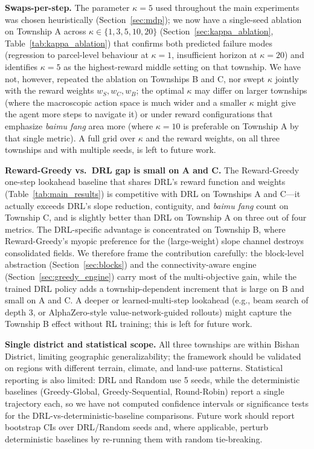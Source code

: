 \documentclass[preprint,12pt]{elsarticle}
\begin{document}
\textbf{Swaps-per-step.} The parameter $\kappa = 5$ used throughout the main experiments was chosen heuristically (Section~\ref{sec:mdp}); we now have a single-seed ablation on Township A across $\kappa \in \{1,3,5,10,20\}$ (Section~\ref{sec:kappa_ablation}, Table~\ref{tab:kappa_ablation}) that confirms both predicted failure modes (regression to parcel-level behaviour at $\kappa{=}1$, insufficient horizon at $\kappa{=}20$) and identifies $\kappa = 5$ as the highest-reward middle setting on that township. We have not, however, repeated the ablation on Townships B and C, nor swept $\kappa$ jointly with the reward weights $w_S, w_C, w_B$; the optimal $\kappa$ may differ on larger townships (where the macroscopic action space is much wider and a smaller $\kappa$ might give the agent more steps to navigate it) or under reward configurations that emphasize \textit{baimu fang} area more (where $\kappa = 10$ is preferable on Township A by that single metric). A full grid over $\kappa$ and the reward weights, on all three townships and with multiple seeds, is left to future work.

\textbf{Reward-Greedy vs.\ DRL gap is small on A and C.} The Reward-Greedy one-step lookahead baseline that shares DRL's reward function and weights (Table~\ref{tab:main_results}) is competitive with DRL on Townships A and C---it actually exceeds DRL's slope reduction, contiguity, and \textit{baimu fang} count on Township C, and is slightly better than DRL on Township A on three out of four metrics. The DRL-specific advantage is concentrated on Township B, where Reward-Greedy's myopic preference for the (large-weight) slope channel destroys consolidated fields. We therefore frame the contribution carefully: the block-level abstraction (Section~\ref{sec:blocks}) and the connectivity-aware engine (Section~\ref{sec:greedy_engine}) carry most of the multi-objective gain, while the trained DRL policy adds a township-dependent increment that is large on B and small on A and C. A deeper or learned-multi-step lookahead (e.g., beam search of depth 3, or AlphaZero-style value-network-guided rollouts) might capture the Township B effect without RL training; this is left for future work.

\textbf{Single district and statistical scope.} All three townships are within Bishan District, limiting geographic generalizability; the framework should be validated on regions with different terrain, climate, and land-use patterns. Statistical reporting is also limited: DRL and Random use 5 seeds, while the deterministic baselines (Greedy-Global, Greedy-Sequential, Round-Robin) report a single trajectory each, so we have not computed confidence intervals or significance tests for the DRL-vs-deterministic-baseline comparisons. Future work should report bootstrap CIs over DRL/Random seeds and, where applicable, perturb deterministic baselines by re-running them with random tie-breaking.
\end{document}

